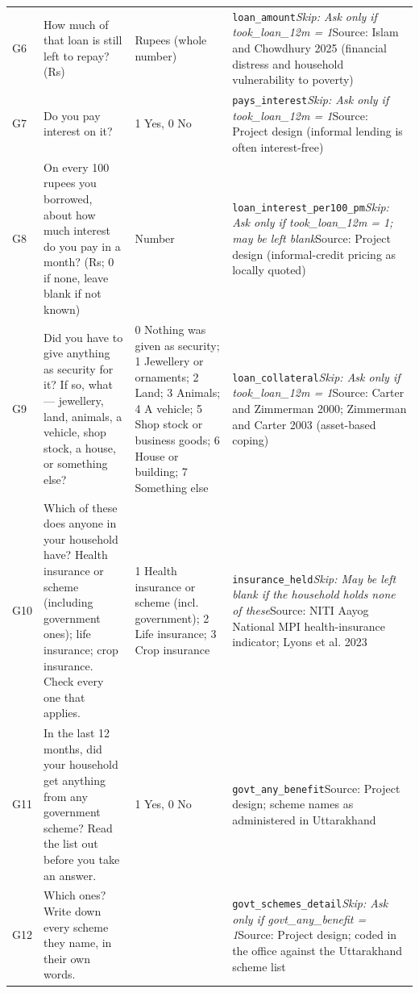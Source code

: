 \documentclass[10pt]{article}
\begin{document}
{\begin{longtable}{p{0.8cm}p{6.4cm}p{3.6cm}p{5.8cm}}
G6 & How much of that loan is still left to repay? (Rs) & Rupees (whole number) & \texttt{loan\_amount}\newline \textit{Skip: Ask only if took\_loan\_12m = 1}\newline Source: Islam and Chowdhury 2025 (financial distress and household vulnerability to poverty) \\
G7 & Do you pay interest on it? & 1 Yes, 0 No & \texttt{pays\_interest}\newline \textit{Skip: Ask only if took\_loan\_12m = 1}\newline Source: Project design (informal lending is often interest-free) \\
G8 & On every 100 rupees you borrowed, about how much interest do you pay in a month? (Rs; 0 if none, leave blank if not known) & Number & \texttt{loan\_interest\_per100\_pm}\newline \textit{Skip: Ask only if took\_loan\_12m = 1; may be left blank}\newline Source: Project design (informal-credit pricing as locally quoted) \\
G9 & Did you have to give anything as security for it? If so, what — jewellery, land, animals, a vehicle, shop stock, a house, or something else? & 0 Nothing was given as security; 1 Jewellery or ornaments; 2 Land; 3 Animals; 4 A vehicle; 5 Shop stock or business goods; 6 House or building; 7 Something else & \texttt{loan\_collateral}\newline \textit{Skip: Ask only if took\_loan\_12m = 1}\newline Source: Carter and Zimmerman 2000; Zimmerman and Carter 2003 (asset-based coping) \\
G10 & Which of these does anyone in your household have? Health insurance or scheme (including government ones); life insurance; crop insurance. Check every one that applies. & 1 Health insurance or scheme (incl. government); 2 Life insurance; 3 Crop insurance & \texttt{insurance\_held}\newline \textit{Skip: May be left blank if the household holds none of these}\newline Source: NITI Aayog National MPI health-insurance indicator; Lyons et al. 2023 \\
G11 & In the last 12 months, did your household get anything from any government scheme? Read the list out before you take an answer. & 1 Yes, 0 No & \texttt{govt\_any\_benefit}\newline Source: Project design; scheme names as administered in Uttarakhand \\
G12 & Which ones? Write down every scheme they name, in their own words. &  & \texttt{govt\_schemes\_detail}\newline \textit{Skip: Ask only if govt\_any\_benefit = 1}\newline Source: Project design; coded in the office against the Uttarakhand scheme list \\
\bottomrule
\end{longtable}
}
\end{document}

